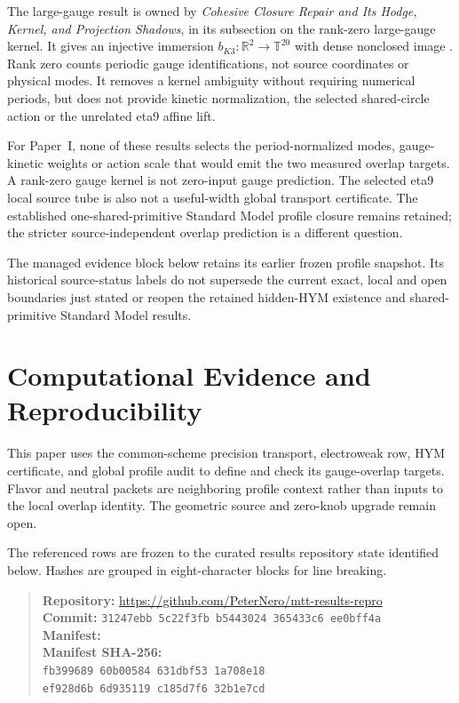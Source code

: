 \documentclass[11pt]{article}
\begin{document}
The large-gauge result is owned by \emph{Cohesive Closure Repair and Its
Hodge, Kernel, and Projection Shadows}, in its subsection on the rank-zero
large-gauge kernel. It gives an injective immersion
$b_{K3}:\mathbb R^2\to\mathbb T^{20}$ with dense nonclosed image
\cite{ThetaBK3}. Rank zero counts periodic gauge identifications, not source
coordinates or physical modes. It removes a kernel ambiguity without
requiring numerical periods, but does not provide kinetic normalization,
the selected shared-circle action or the unrelated eta9 affine lift.

For Paper~I, none of these results selects the period-normalized modes,
gauge-kinetic weights or action scale that would emit the two measured
overlap targets. A rank-zero gauge kernel is not zero-input gauge prediction.
The selected eta9 local source tube is also not a useful-width global
transport certificate. The established one-shared-primitive Standard Model
profile closure remains retained; the stricter source-independent overlap
prediction is a different question.


The managed evidence block below retains its earlier frozen profile snapshot.
Its historical source-status labels do not supersede the current exact,
local and open boundaries just stated or reopen the retained hidden-HYM
existence and shared-primitive Standard Model results.

\section*{Computational Evidence and Reproducibility}
This paper uses the common-scheme precision transport, electroweak row, HYM certificate, and global profile audit to define and check its gauge-overlap targets. Flavor and neutral packets are neighboring profile context rather than inputs to the local overlap identity. The geometric source and zero-knob upgrade remain open.

The referenced rows are frozen to the curated results repository state identified below. Hashes are grouped in eight-character blocks for line breaking.
\begin{quote}\small
\textbf{Repository:} \url{https://github.com/PeterNero/mtt-results-repro}\\
\textbf{Commit:} \texttt{31247ebb 5c22f3fb b5443024 365433c6 ee0bff4a}\\
\textbf{Manifest:} \\
\textbf{Manifest SHA-256:}\\
\texttt{fb399689 60b00584 631dbf53 1a708e18}\\
\texttt{ef928d6b 6d935119 c185d7f6 32b1e7cd}
\end{quote}
\end{document}
